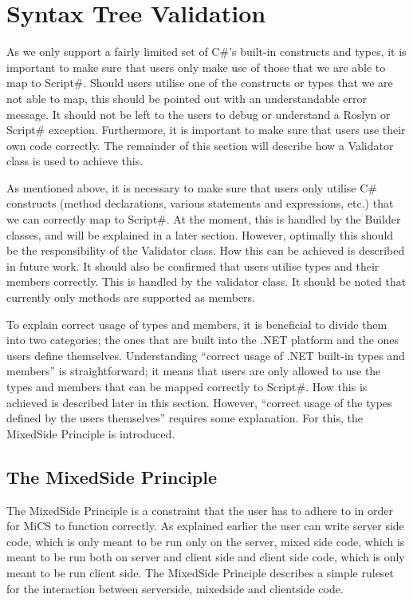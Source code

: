 \section{Syntax Tree Validation} %
\label{sec:syntax_tree_validation}
	As we only support a fairly limited set of C\#’s built-in constructs and types, it is important to make sure that users only make use of those that we are able to map to Script\#. Should users utilise one of the constructs or types that we are not able to map, this should be pointed out with an understandable error message. It should not be left to the users to debug or understand a Roslyn or Script\# exception. Furthermore, it is important to make sure that users use their own code correctly. The remainder of this section will describe how a Validator class is used to achieve this.

	As mentioned above, it is necessary to make sure that users only utilise C\# constructs (method declarations, various statements and expressions, etc.) that we can correctly map to Script\#. At the moment, this is handled by the Builder classes, and will be explained in a later section. However, optimally this should be the responsibility of the Validator class. How this can be achieved is described in future work. It should also be confirmed that users utilise types and their members correctly. This is handled by the validator class. It should be noted that currently only methods are supported as members.

	To explain correct usage of types and members, it is beneficial to divide them into two categories; the ones that are built into the .NET platform and the ones users define themselves. Understanding “correct usage of .NET built-in types and members” is straightforward; it means that users are only allowed to use the types and members that can be mapped correctly to Script\#. How this is achieved is described later in this section. However, “correct usage of the types defined by the users themselves” requires some explanation. For this, the MixedSide Principle is introduced.

	\subsection{The MixedSide Principle} %
	\label{sub:the_mixedside_principle}
		The MixedSide Principle is a constraint that the user has to adhere to in order for MiCS to function correctly. As explained earlier the user can write server side code, which is only meant to be run only on the server, mixed side code, which is meant to be run both on server and client side and client side code, which is only meant to be run client side. The MixedSide Principle describes a simple ruleset for the interaction between serverside, mixedside and clientside code.

